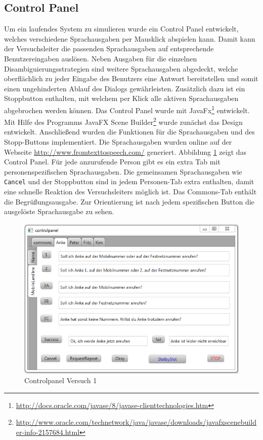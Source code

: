 \documentclass[12pt,a4paper]{scrartcl}
\begin{document}
\subsection{Control Panel}
Um ein laufendes System zu simulieren wurde ein Control Panel entwickelt, welches verschiedene Sprachausgaben per Mausklick abspielen kann. Damit kann der Versuchsleiter die passenden Sprachausgaben auf entsprechende Benutzereingaben auslösen. Neben Ausgaben für die einzelnen Disambiguierungsstrategien sind weitere Sprachausgaben abgedeckt, welche oberflächlich zu jeder Eingabe des Benutzers eine Antwort bereitstellen und somit einen ungehinderten Ablauf des Dialogs gewährleisten. Zusätzlich dazu ist ein Stoppbutton enthalten, mit welchem per Klick alle aktiven Sprachausgaben abgebrochen werden können. 
Das Control Panel wurde mit JavaFx\footnote{\label{foot:javafx}\url{http://docs.oracle.com/javase/8/javase-clienttechnologies.htm}} entwickelt. Mit Hilfe des Programms JavaFX Scene Builder\footnote{\label{foot:fxsb}\url{http://www.oracle.com/technetwork/java/javase/downloads/javafxscenebuilder-info-2157684.html}} wurde zunächst das Design entwickelt. Anschließend wurden die Funktionen für die Sprachausgaben und des Stopp-Buttons implementiert. Die Sprachausgaben wurden online auf der Webseite \url{http://www.fromtexttospeech.com/} generiert. 
Abbildung \ref{cp1} zeigt das Control Panel. Für jede anzurufende Person gibt es ein extra Tab mit personenspezifischen Sprachausgaben. Die gemeinsamen Sprachausgaben wie \texttt{Cancel} und der Stoppbutton sind in jedem Personen-Tab extra enthalten, damit eine schnelle Reaktion des Versuchsleiters möglich ist. Das Commons-Tab enthält die Begrüßungsausgabe. Zur Orientierung ist nach jedem spezifischen Button die ausgelöste Sprachausgabe zu sehen. 
\begin{figure}[htbp]
\includegraphics[width=13cm]{controlpanel.png}
\caption{Controlpanel Versuch 1}
\label{cp1}
\end{figure}
\end{document}

